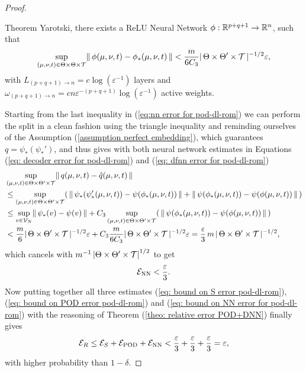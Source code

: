 \begin{proof}
\begin{enumerate}
        Theorem Yarotski, there exists a ReLU Neural Network $\phi: \mathbb{R}^{p+q+1} \to \mathbb{R}^n$, such that
        \begin{equation} \label{eq: dfnn error for pod-dl-rom}
            \sup\limits_{(\mu, \nu, t) \in \Theta \times \Theta \times \mathcal{T}} \lVert \, \phi(\mu, \nu, t) - \phi_*(\mu, \nu, t) \, \rVert 
            < \frac{m}{6 C_3} \vert \, \Theta \times \Theta' \times \mathcal{T} \, \vert^{-1/2} \varepsilon,
        \end{equation}
        with $L_{(p+q+1) \to n} = c \log(\varepsilon^{-1})$ layers and $\omega_{(p+q+1) \to n} = c n \varepsilon^{-(p+q+1)} \log(\varepsilon^{-1})$ active weights.
    \end{enumerate}
    Starting from the last inequality in (\ref{eq:nn error for pod-dl-rom}) we can perform the split in a clean fashion
    using the triangle inequality and reminding ourselves of the Assumption (\ref{assumption perfect embedding}), which
    guarantees $q = \psi_*(\psi_*')$, and thus gives with both neural network estimates in Equations (\ref{eq: decoder error for pod-dl-rom})
    and (\ref{eq: dfnn error for pod-dl-rom}) 
    \begin{align*}
        &\sup_{(\mu, \nu, t) \in \Theta \times \Theta' \times \mathcal{T}} \lVert \, q(\mu, \nu, t) - \hat{q}(\mu, \nu, t) \, \rVert \\
        &\leq \sup\limits_{(\mu, \nu, t) \in \Theta \times \Theta' \times \mathcal{T}} 
            ( \, \lVert \, \psi_*(\psi_*'(\mu, \nu, t)) - \psi(\phi_*(\mu, \nu, t)) \, \rVert + 
            \lVert \, \psi(\phi_*(\mu, \nu, t)) - \psi(\phi(\mu, \nu, t)) \, \rVert \, )  \\
        &\leq 
            \sup\limits_{v \in \mathcal{V}_N} \lVert \, \psi_*(v) - \psi(v) \, \rVert + 
            C_3 \sup\limits_{(\mu, \nu, t) \in \Theta \times \Theta' \times \mathcal{T}} 
            ( \, \lVert \, \psi(\phi_*(\mu, \nu, t)) - \psi(\phi(\mu, \nu, t)) \, \rVert \, )  \\
        &< \frac{m}{6} \vert \, \Theta \times \Theta' \times \mathcal{T} \, \vert^{-1/2} \varepsilon + 
        C_3 \frac{m}{6 C_3} \vert \, \Theta \times \Theta' \times \mathcal{T} \, \vert^{-1/2} \varepsilon = 
        \frac{\varepsilon}{3}\, m \, \vert \, \Theta \times \Theta' \times \mathcal{T} \, \vert^{-1/2},
    \end{align*}
    which cancels with $m^{-1} \left| \Theta \times \Theta' \times \mathcal{T} \right|^{1/2}$ to get 
    \begin{equation} \label{eq: bound on NN error for pod-dl-rom}
        \mathcal{E}_{\text{NN}} < \frac{\varepsilon}{3}.
    \end{equation}
    Now putting together all three estimates (\ref{eq: bound on S error pod-dl-rom}), 
    (\ref{eq: bound on POD error pod-dl-rom}) and (\ref{eq: bound on NN error for pod-dl-rom}) 
    with the reasoning of Theorem (\ref{theo: relative error POD+DNN}) finally gives
    \begin{equation*}
        \mathcal{E}_R \leq \mathcal{E}_{S} + \mathcal{E}_{\text{POD}} + \mathcal{E}_{\text{NN}} < \frac{\varepsilon}{3} + \frac{\varepsilon}{3}
        + \frac{\varepsilon}{3} = \varepsilon,
    \end{equation*}
    with higher probability than $1 - \delta$.
\end{proof}

